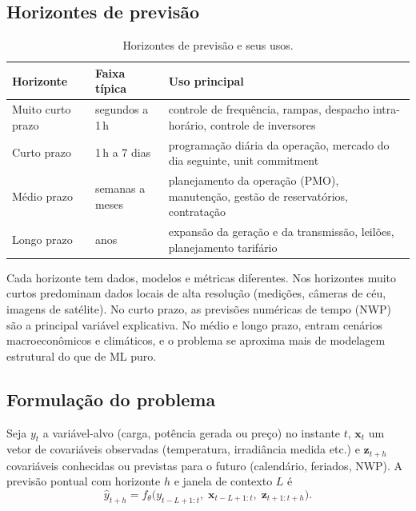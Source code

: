 \documentclass[11pt,a4paper]{article}
\begin{document}
\subsection{Horizontes de previsão}

\begin{table}[h]
\centering
\begin{tabularx}{\textwidth}{l l L}
\toprule
\textbf{Horizonte} & \textbf{Faixa típica} & \textbf{Uso principal} \\
\midrule
Muito curto prazo & segundos a 1\,h & controle de frequência, rampas,
  despacho intra-horário, controle de inversores \\
Curto prazo & 1\,h a 7 dias & programação diária da operação, mercado do dia
  seguinte, unit commitment \\
Médio prazo & semanas a meses & planejamento da operação (PMO), manutenção,
  gestão de reservatórios, contratação \\
Longo prazo & anos & expansão da geração e da transmissão, leilões,
  planejamento tarifário \\
\bottomrule
\end{tabularx}
\caption{Horizontes de previsão e seus usos.}
\end{table}

Cada horizonte tem dados, modelos e métricas diferentes. Nos horizontes muito
curtos predominam dados locais de alta resolução (medições, câmeras de céu,
imagens de satélite). No curto prazo, as previsões numéricas de tempo (NWP)
são a principal variável explicativa. No médio e longo prazo, entram
cenários macroeconômicos e climáticos, e o problema se aproxima mais de
modelagem estrutural do que de ML puro.

\subsection{Formulação do problema}

Seja $y_t$ a variável-alvo (carga, potência gerada ou preço) no instante $t$,
$\mathbf{x}_t$ um vetor de covariáveis observadas (temperatura, irradiância
medida etc.) e $\mathbf{z}_{t+h}$ covariáveis conhecidas ou previstas para o
futuro (calendário, feriados, NWP). A previsão pontual com horizonte $h$ e
janela de contexto $L$ é
\begin{equation}
  \hat{y}_{t+h} = f_\theta\big(y_{t-L+1:t},\; \mathbf{x}_{t-L+1:t},\;
  \mathbf{z}_{t+1:t+h}\big).
\end{equation}
\end{document}
